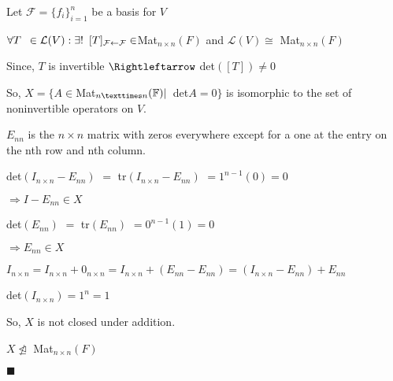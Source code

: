 \documentclass{article}
\begin{document}
\vspace{0.618 em}

Let $\mathcal{F} = \{f_i\}_{i=1}^n$ be a basis for $V$

$\forall T\enskip\in
\mathcal{L}(V): \exists!\enskip
[T]_{\mathcal{F}\leftarrow \mathcal{F}} \in $Mat$_{n \times n}(F)$ and
$\mathcal{L}(V) \cong$ Mat$_{n \times n}(F)$

Since, $T$ is invertible $\Rightleftarrow$ det$([T]) \neq 0$

So, $X = \{A \in $Mat$_{n×n}(\mathbb{F}) |\enskip $det$ A =0\}$ is
isomorphic to the set of noninvertible operators on $V$.

$E_{nn}$ is the $n \times n$ matrix with zeros everywhere except for a one at the entry on
the nth row and nth column.

det$(I_{n \times n} - E_{nn})$ $=$ tr$(I_{n \times n} -E_{nn})$ $= 1^{n-1}(0) = 0$

$\Rightarrow I -E_{nn} \in X$

det$(E_{nn})$ $=$ tr$(E_{nn})$ $= 0^{n-1}(1) = 0$

$\Rightarrow E_{nn} \in X$

$I_{n \times n} = I_{n \times n} + 0_{n \times n} = I_{n \times
  n}+(E_{nn} - E_{nn})  = (I_{n \times n} -E_{nn}) + E_{nn}$

det$(I_{n \times n}) = 1^n = 1$

So, $X$ is not closed under addition.

$X \not\trianglelefteq$ Mat$_{n \times n}(F)$

\vspace{0.618 em}
$\blacksquare$
\end{document}
